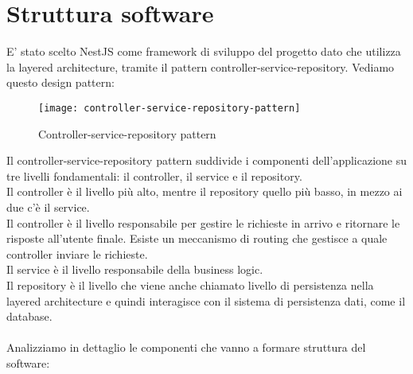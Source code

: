\section{Struttura software}
E' stato scelto NestJS come framework di sviluppo del progetto dato che utilizza la layered architecture,
tramite il pattern controller-service-repository. Vediamo questo design pattern:
\begin{figure}[H]
    \centering
    \texttt{[image: controller-service-repository-pattern]}
    \caption{Controller-service-repository pattern}
\end{figure}
\leavevmode\newline
Il controller-service-repository pattern suddivide i componenti dell'applicazione su tre livelli fondamentali:
il controller, il service e il repository.
\\
Il controller è il livello più alto, mentre il repository quello più basso, in mezzo ai due c'è il service.
\\
Il controller è il livello responsabile per gestire le richieste in arrivo e ritornare le risposte all'utente finale.
Esiste un meccanismo di routing che gestisce a quale controller inviare le richieste.
\\
Il service è il livello responsabile della business logic.
\\
Il repository è il livello che viene anche chiamato livello di persistenza nella layered architecture e quindi interagisce
con il sistema di persistenza dati, come il database.
\\\\
Analizziamo in dettaglio le componenti che vanno a formare struttura del software:

